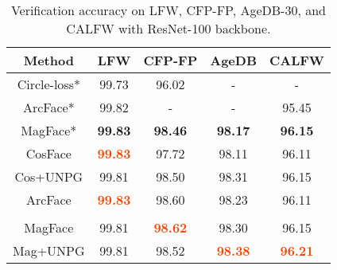 \documentclass[10pt,twocolumn]{article}
\begin{document}
\begin{table}[t]
    \caption{Verification accuracy on LFW, CFP-FP, AgeDB-30, and CALFW with ResNet-100 backbone.}
    \label{tab:lfw}
      \centering
        {\small
        \begin{tabular}[]{c c c c c }
         \hline
         \textbf{Method} & \textbf{LFW} & \textbf{CFP-FP} & \textbf{AgeDB} & \textbf{CALFW} \\
         \hline
         Circle-loss*  & 99.73 & 96.02 & - & -  \\
         ArcFace*  & 99.82 & - & - & 95.45 \\
         MagFace*  & \textbf{99.83} & \textbf{98.46} & \textbf{98.17} & \textbf{96.15} \\
         \hline
         CosFace & \textbf{\textcolor{OrangeRed}{99.83}} & 97.72 & 98.11 & 96.11 \\
         \rowcolor{lightgray!20}
         Cos+UNPG & 99.81 & 98.50 & 98.31 & 96.15 \\
ArcFace & \textbf{\textcolor{OrangeRed}{99.83}} & 98.60 & 98.23 & 96.11 \\
\cellcolor{lightgray!20}{Arc+UNPG} & \cellcolor{lightgray!20}{\textbf{\textcolor{OrangeRed}{99.83}}} & \cellcolor{lightgray!20}{98.60} & \cellcolor{lightgray!20}{98.25} & \cellcolor{lightgray!20}{96.13} \\
MagFace & 99.81 & \textbf{\textcolor{OrangeRed}{98.62}} & 98.30 & 96.15 \\
         \rowcolor{lightgray!20}
         Mag+UNPG & 99.81 & 98.52 & \textbf{\textcolor{OrangeRed}{98.38}} & \textbf{\textcolor{OrangeRed}{96.21}} \\
         \hline
        \end{tabular}
        }
\end{table}
\end{document}
